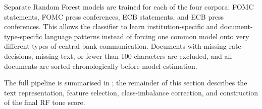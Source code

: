 Separate Random Forest models are trained for each of the four
corpora: FOMC statements, FOMC press conferences, ECB statements,
and ECB press conferences. This allows the classifier to learn
institution-specific and document-type-specific language patterns
instead of forcing one common model onto very different types of
central bank communication. Documents with missing rate decisions,
missing text, or fewer than 100 characters are excluded, and all
documents are sorted chronologically before model estimation.

The full pipeline is summarised in ; the
remainder of this section describes the text representation,
feature selection, class-imbalance correction, and construction of
the final RF tone score.

